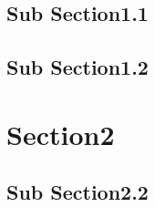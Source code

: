 \documentclass{mycv}
\begin{document}
\section{\name}
\subsection{Sub Section1.1}
\subsection{Sub Section1.2}
\section{Section2}
\subsection{Sub Section2.2}
\end{document}
